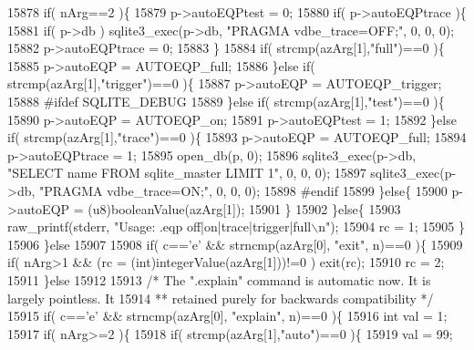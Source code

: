 \begin{DoxyCode}
{{{{{{{{{{{{{15878     \textcolor{keywordflow}{if}( nArg==2 )\{
15879       p->autoEQPtest = 0;
15880       \textcolor{keywordflow}{if}( p->autoEQPtrace )\{
15881         \textcolor{keywordflow}{if}( p->db ) sqlite3_exec(p->db, \textcolor{stringliteral}{"PRAGMA vdbe\_trace=OFF;"}, 0, 0, 0);
15882         p->autoEQPtrace = 0;
15883       \}
15884       \textcolor{keywordflow}{if}( strcmp(azArg[1],\textcolor{stringliteral}{"full"})==0 )\{
15885         p->autoEQP = AUTOEQP_full;
15886       \}\textcolor{keywordflow}{else} \textcolor{keywordflow}{if}( strcmp(azArg[1],\textcolor{stringliteral}{"trigger"})==0 )\{
15887         p->autoEQP = AUTOEQP_trigger;
15888 \textcolor{preprocessor}{#ifdef SQLITE\_DEBUG}
15889       \}\textcolor{keywordflow}{else} \textcolor{keywordflow}{if}( strcmp(azArg[1],\textcolor{stringliteral}{"test"})==0 )\{
15890         p->autoEQP = AUTOEQP_on;
15891         p->autoEQPtest = 1;
15892       \}\textcolor{keywordflow}{else} \textcolor{keywordflow}{if}( strcmp(azArg[1],\textcolor{stringliteral}{"trace"})==0 )\{
15893         p->autoEQP = AUTOEQP_full;
15894         p->autoEQPtrace = 1;
15895         open_db(p, 0);
15896         sqlite3_exec(p->db, \textcolor{stringliteral}{"SELECT name FROM sqlite\_master LIMIT 1"}, 0, 0, 0);
15897         sqlite3_exec(p->db, \textcolor{stringliteral}{"PRAGMA vdbe\_trace=ON;"}, 0, 0, 0);
15898 \textcolor{preprocessor}{#endif}
15899       \}\textcolor{keywordflow}{else}\{
15900         p->autoEQP = (u8)booleanValue(azArg[1]);
15901       \}
15902     \}\textcolor{keywordflow}{else}\{
15903       raw_printf(stderr, \textcolor{stringliteral}{"Usage: .eqp off|on|trace|trigger|full\(\backslash\)n"});
15904       rc = 1;
15905     \}
15906   \}\textcolor{keywordflow}{else}
15907 
15908   \textcolor{keywordflow}{if}( c==\textcolor{charliteral}{'e'} && strncmp(azArg[0], \textcolor{stringliteral}{"exit"}, n)==0 )\{
15909     \textcolor{keywordflow}{if}( nArg>1 && (rc = (\textcolor{keywordtype}{int})integerValue(azArg[1]))!=0 ) exit(rc);
15910     rc = 2;
15911   \}\textcolor{keywordflow}{else}
15912 
15913   \textcolor{comment}{/* The ".explain" command is automatic now.  It is largely pointless.  It}
15914 \textcolor{comment}{  ** retained purely for backwards compatibility */}
15915   \textcolor{keywordflow}{if}( c==\textcolor{charliteral}{'e'} && strncmp(azArg[0], \textcolor{stringliteral}{"explain"}, n)==0 )\{
15916     \textcolor{keywordtype}{int} val = 1;
15917     \textcolor{keywordflow}{if}( nArg>=2 )\{
15918       \textcolor{keywordflow}{if}( strcmp(azArg[1],\textcolor{stringliteral}{"auto"})==0 )\{
15919         val = 99;
}}}}}}}}}}}}}
\end{DoxyCode}
